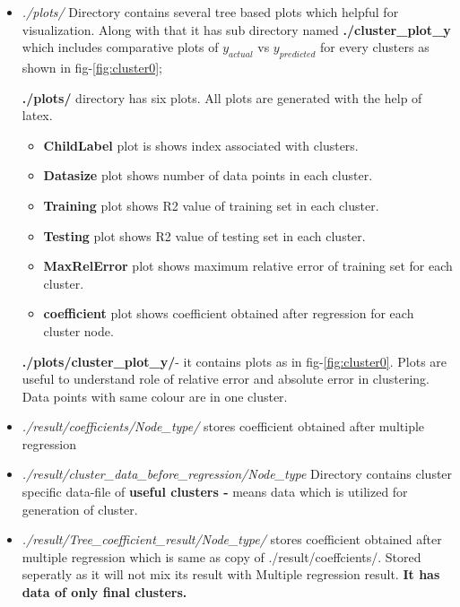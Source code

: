 \documentclass[12pt]{article}
\begin{document}
\begin{itemize}[wide = 0pt, labelwidth = 1.3333em, labelsep = 0.3333em, leftmargin = \dimexpr{} + \relax ]
\begin{itemize}
\begin{itemize}
					
					
					\item \textit{ ./plots/} 
					\subitem  Directory contains several tree based plots which helpful for visualization. Along with that it has sub directory named \textbf{ ./cluster\_plot\_y} which includes comparative plots of $y_{actual}$ vs $y_{predicted}$ for every clusters as shown in fig-\ref{fig:cluster0};
					
					 \textbf{./plots/} directory has six plots. All plots are generated with the help of latex. 
					 \begin{itemize}
						 \item \textbf{ChildLabel} plot is shows index associated with clusters. 
						 \item \textbf{Datasize} plot shows number of data points in each cluster. 
						 \item \textbf{Training} plot shows R2 value of training set in each cluster. 
						 \item  \textbf{Testing} plot shows R2 value of testing set in each cluster.  
						 \item \textbf{MaxRelError} plot shows maximum relative error of training set for each cluster. 
						 \item \textbf{coefficient} plot shows coefficient obtained after regression for each cluster node.
					 \end{itemize}
					
					\textbf{./plots/cluster\_plot\_y/}- it contains plots as in fig-\ref{fig:cluster0}. Plots are useful to understand role of relative error and absolute error in clustering. Data points with same colour are in one cluster. \\
					
					\item \textit{ ./result/coefficients/Node\_type/}
					\subitem  stores coefficient obtained after multiple regression  \\
					
					\item \textit{ ./result/cluster\_data\_before\_regression/Node\_type}
					\subitem  Directory contains cluster specific data-file of \textbf{useful clusters -} means data which is utilized for generation of cluster. \\
					
					\item \textit{ ./result/Tree\_coefficient\_result/Node\_type/}
					\subitem  stores coefficient obtained after multiple regression which is same as copy of ./result/coeffcients/. Stored seperatly as it will not mix its result with Multiple regression result. \textbf{It has data of only final clusters.} \\
					

\end{itemize}
\end{itemize}
\end{itemize}
\end{document}
